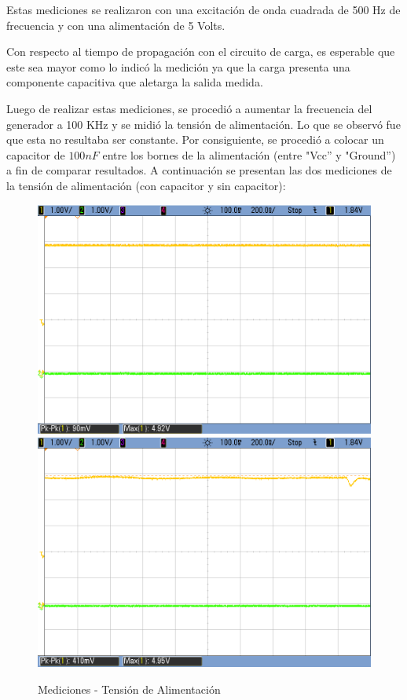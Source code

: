 Estas mediciones se realizaron con una excitación de onda cuadrada
de 500 Hz de frecuencia y con una alimentación de 5 Volts.

Con respecto al tiempo de propagación con el circuito de carga, es
esperable que este sea mayor como lo indicó la medición ya que la
carga presenta una componente capacitiva que aletarga la salida medida.

Luego de realizar estas mediciones, se procedió a aumentar la frecuencia
del generador a 100 KHz y se midió la tensión de alimentación. Lo que
se observó fue que esta no resultaba ser constante. Por consiguiente,
se procedió a colocar un capacitor de $100nF$ entre los bornes de
la alimentación (entre "Vcc'' y "Ground'') a fin de comparar
resultados. A continuación se presentan las dos mediciones de la tensión
de alimentación (con capacitor y sin capacitor):

\begin{figure}[H]
    \centering
\includegraphics[scale=0.3]{AlimentacionConDesacople}
\qquad
\includegraphics[scale=0.3]{AlimentacionSinDesacople}
\caption{Mediciones - Tensión de Alimentación}
\end{figure}

